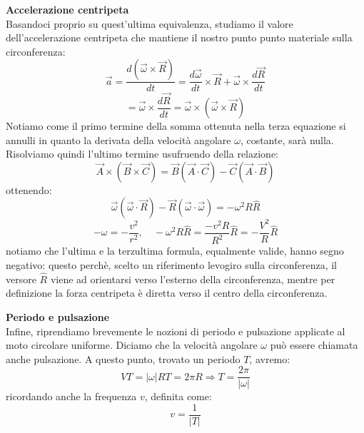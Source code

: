 \documentclass[a4paper,12pt]{article}
\begin{document}
\textbf{Accelerazione centripeta} \\
Basandoci proprio su quest'ultima equivalenza, studiamo il valore dell'accelerazione centripeta che mantiene il nostro punto
punto materiale sulla circonferenza:
$$ \vec{a} = \frac{d(\vec{\omega} \times \vec{R})}{dt} = \frac{d\vec{\omega}}{dt} \times \vec{R} + \vec{\omega} \times \frac{d\vec{R}}{dt}$$
$$ = \vec{\omega} \times \frac{d\vec{R}}{dt} = \vec{\omega} \times (\vec{\omega} \times \vec{R}) $$
Notiamo come il primo termine della somma ottenuta nella terza equazione si annulli in quanto la derivata della velocità
angolare $\omega$, costante, sarà nulla. Risolviamo quindi l'ultimo termine usufruendo
della relazione:
$$ \vec{A} \times (\vec{B} \times \vec{C}) = \vec{B}(\vec{A} \cdot \vec{C}) - \vec{C}(\vec{A} \cdot \vec{B}) $$
ottenendo:
$$ \vec{\omega} (\vec{\omega} \cdot \vec{R}) - \vec{R}(\vec{\omega} \cdot \vec{\omega}) = -\omega^2 R \hat{R} $$
$$ -\omega = -\frac{v^2}{r^2}, \quad -\omega^2 R \hat{R} = \frac{-v^2 R}{R^2} \hat{R} = -\frac{V^2}{R} \hat{R} $$
notiamo che l'ultima e la terzultima formula, equalmente valide, hanno segno negativo: questo perchè, scelto
un riferimento levogiro sulla circonferenza, il versore $\hat{R}$ viene ad orientarsi verso l'esterno della circonferenza,
mentre per definizione la forza centripeta è diretta verso il centro della circonferenza.
\par\smallskip
\textbf{Periodo e pulsazione} \\
Infine, riprendiamo brevemente le nozioni di periodo e pulsazione applicate al moto circolare uniforme. Diciamo
che la velocità angolare $\omega$ può essere chiamata anche pulsazione. A questo punto, trovato un periodo $T$, avremo:
$$ VT = |\omega|RT = 2\pi R \Rightarrow T = \frac{2\pi}{|\omega|} $$
ricordando anche la frequenza $v$, definita come:
$$ v = \frac{1}{|T|} $$
\end{document}
